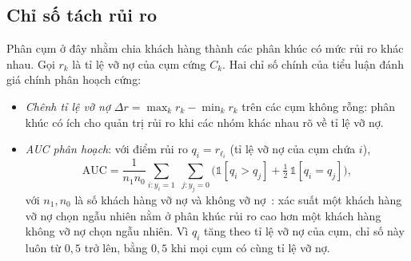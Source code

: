 \subsection{Chỉ số tách rủi ro}
\label{sec:chi-so-rui-ro}

Phân cụm ở đây nhằm chia khách hàng thành các phân khúc có mức rủi ro khác nhau. Gọi $r_k$ là tỉ lệ vỡ nợ của cụm cứng
$C_k$. Hai chỉ số chính của tiểu luận đánh giá chính phân hoạch cứng:
\begin{itemize}
\item \emph{Chênh tỉ lệ vỡ nợ} $\Delta r = \max_k r_k - \min_k r_k$ trên các cụm không rỗng: phân khúc có ích cho quản
trị rủi ro khi các nhóm khác nhau rõ về tỉ lệ vỡ nợ.
\item \emph{AUC phân hoạch}: với điểm rủi ro $q_i = r_{\ell_i}$ (tỉ lệ vỡ nợ của cụm chứa $i$),
\begin{equation}
  \mathrm{AUC} = \frac{1}{n_1 n_0} \sum_{i : y_i = 1} \; \sum_{j : y_j = 0}
     \Big( \mathbb{1}[q_i > q_j] + \tfrac{1}{2}\,\mathbb{1}[q_i = q_j] \Big),
  \label{eq:chi-so-auc}
\end{equation}
với $n_1, n_0$ là số khách hàng vỡ nợ và không vỡ nợ~\cite{fawcett2006roc}: xác suất một khách hàng vỡ nợ chọn ngẫu nhiên
nằm ở phân khúc rủi ro cao hơn một khách hàng không vỡ nợ chọn ngẫu nhiên. Vì $q_i$ tăng theo tỉ lệ vỡ nợ của cụm, chỉ số này
luôn từ $0{,}5$ trở lên, bằng $0{,}5$ khi mọi cụm có cùng tỉ lệ vỡ nợ.
\end{itemize}
